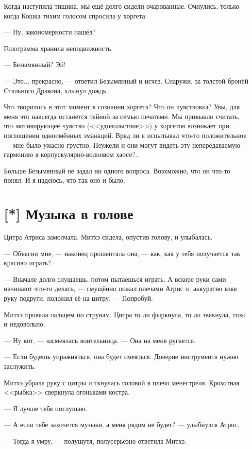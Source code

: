 Когда наступила тишина, мы ещё долго сидели очарованные.
Очнулись, только когда Кошка тихим голосом спросила у хоргета:

--- Ну, закономерности нашёл?

Голограмма хранила неподвижность.

--- Безымянный?
Эй!

--- Это... прекрасно, --- ответил Безымянный и исчез.
Снаружи, за толстой бронёй Стального Дракона, хлынул дождь.

Что творилось в этот момент в сознании хоргета?
Что он чувствовал?
Увы, для меня это навсегда останется тайной за семью печатями.
Мы привыкли считать, что мотивирующее чувство (<<удовольствие>>) у хоргетов возникает при поглощении одноимённых эманаций.
Вряд ли я испытывал что-то положительное --- мне было ужасно грустно.
Неужели и они могут видеть эту непередаваемую гармонию в корпускулярно-волновом хаосе?..

Больше Безымянный не задал ни одного вопроса.
Возхможно, что он что-то понял.
И я надеюсь, что так оно и было.

\section{[*] Музыка в голове}

\textspace

Цитра Атриса замолчала.
Митхэ сидела, опустив голову, и улыбалась.

--- Объясни мне, --- наконец прошептала она, --- как, как у тебя получается так красиво играть?

--- Вначале долго слушаешь, потом пытаешься играть.
А вскоре руки сами начинают что-то делать, --- смущённо пожал плечами Атрис и, аккуратно взяв руку подруги, положил её на цитру.
--- Попробуй.

Митхэ провела пальцем по струнам.
Цитра то ли фыркнула, то ли звякнула, тихо и недовольно.

--- Ну вот, --- засмеялась воительница.
--- Она на меня ругается.

--- Если будешь упражняться, она будет смеяться.
Доверие инструмента нужно заслужить.

Митхэ убрала руку с цитры и ткнулась головой в плечо менестреля.
Крохотная <<рыбка>> сверкнула огоньками костра.

--- Я лучше тебя послушаю.

--- А если тебе захочется музыки, а меня рядом не будет? --- улыбнулся Атрис.

--- Тогда я умру, --- полушутя, полусерьёзно ответила Митхэ.

